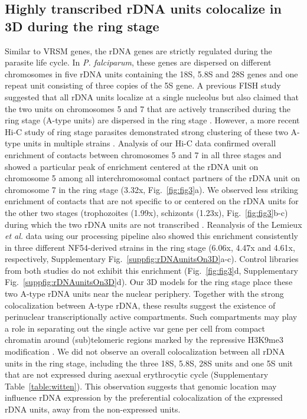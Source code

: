 \subsection*{Highly transcribed rDNA units colocalize in 3D during the ring stage}
Similar to VRSM genes, the rDNA genes are strictly regulated during the parasite life cycle. In {\em P. falciparum}, these genes are dispersed on different chromosomes in five rDNA units containing the 18S, 5.8S and 28S genes and one repeat unit consisting of three copies of the 5S gene. A previous FISH study suggested that all rDNA units localize at a single nucleolus but also claimed that the two units on chromosomes 5 and 7 that are actively transcribed during the ring stage (A-type units) are dispersed in the ring stage \citep{mancio-silva:clustering}. However, a more recent Hi-C study of ring stage parasites demonstrated strong clustering of these two A-type units in multiple strains \citep{lemieux:genome-wide}. Analysis of our Hi-C data confirmed overall enrichment of contacts between chromosomes 5 and 7 in all three stages and showed a particular peak of enrichment centered at the rDNA unit on chromosome 5 among all interchromosomal contact partners of the rDNA unit on chromosome 7 in the ring stage (3.32x, Fig.~\ref{fig:fig3}a). We observed less striking enrichment of contacts that are not specific to or centered on the rDNA units for the other two stages (trophozoites (1.99x), schizonts (1.23x), Fig.~\ref{fig:fig3}b-c) during which the two rDNA units are not transcribed \citep{mancio-silva:clustering}. Reanalysis of the Lemieux {\em et al.} data using our processing pipeline also showed this enrichment consistently in three different NF54-derived strains in the ring stage (6.06x, 4.47x and 4.61x, respectively, Supplementary Fig.~\ref*{suppfig:rDNAunitsOn3D}a-c). Control libraries from both studies do not exhibit this enrichment (Fig.~\ref{fig:fig3}d, Supplementary Fig.~\ref*{suppfig:rDNAunitsOn3D}d). Our 3D models for the ring stage place these two A-type rDNA units near the nuclear periphery. Together with the strong colocalization between A-type rDNA, these results suggest the existence of perinuclear transcriptionally active compartments. Such compartments may play a role in separating out the single active var gene per cell from compact chromatin around (sub)telomeric regions marked by the repressive H3K9me3 modification \citep{lopez-rubio:genome-wide}. We did not observe an overall colocalization between all rDNA units in the ring stage, including the three 18S, 5.8S, 28S units and one 5S unit that are not expressed during asexual erythrocytic cycle (Supplementary Table~\ref*{table:witten}).  This observation suggests that genomic location may influence rDNA expression by the preferential colocalization of the expressed rDNA units, away from the non-expressed units.

